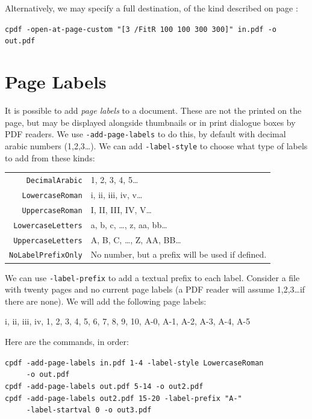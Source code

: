 \documentclass{book}
\begin{document}
Alternatively, we may specify a full destination, of the kind described on page \pageref{destinations}:
  \begin{framed}
    \noindent\small\verb!cpdf -open-at-page-custom "[3 /FitR 100 100 300 300]" in.pdf -o out.pdf!
  \end{framed}


\section{Page Labels}

It is possible to add \textit{page labels} to a document. These are not the printed on the page, but may be displayed alongside thumbnails or in print dialogue boxes by PDF readers. We use \texttt{-add-page-labels} to do this, by default with decimal arabic numbers (1,2,3\ldots). We can add \texttt{-label-style} to choose what type of labels to add from these kinds:

\vspace{4mm}
{\small\begin{tabular}{rl}
  \texttt{DecimalArabic} & 1, 2, 3, 4, 5\ldots \\
  \texttt{LowercaseRoman} & i, ii, iii, iv, v\ldots \\
  \texttt{UppercaseRoman} & I, II, III, IV, V\ldots \\
  \texttt{LowercaseLetters} & a, b, c, \ldots , z, aa, bb\ldots \\
  \texttt{UppercaseLetters} & A, B, C, \ldots , Z, AA, BB\ldots \\
  \texttt{NoLabelPrefixOnly} & No number, but a prefix will be used if defined.
\end{tabular}}
\vspace{4mm}

\noindent We can use \texttt{-label-prefix} to add a textual prefix to each label. 
Consider a file with twenty pages and no current page labels (a PDF reader will assume 1,2,3\ldots if there are none). We will add the following page labels:

\vspace{4mm}
i, ii, iii, iv, 1, 2, 3, 4, 5, 6, 7, 8, 9, 10, A-0, A-1, A-2, A-3, A-4, A-5
\vspace{4mm}

\noindent Here are the commands, in order:

{\small\begin{framed}
  \noindent\verb!cpdf -add-page-labels in.pdf 1-4 -label-style LowercaseRoman!\\
  \noindent\verb!     -o out.pdf!\\
  
  \noindent\verb!cpdf -add-page-labels out.pdf 5-14 -o out2.pdf!\\

  \noindent\verb!cpdf -add-page-labels out2.pdf 15-20 -label-prefix "A-"!\\
  \noindent\verb!     -label-startval 0 -o out3.pdf!
\end{framed}}
\end{document}
